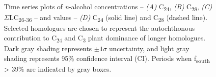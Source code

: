 \begin{figure}[p]
	\caption[\textit{n}-alcohol concentration and  time-series plots]{Time series plots of \textit{n}-alcohol concentrations -- \textit{(A)} C\textsubscript{24}, \textit{(B)} C\textsubscript{28}, \textit{(C)} $\Sigma$LC\textsubscript{26-36} -- and  values -- \textit{(D)} C\textsubscript{24} (solid line) and C\textsubscript{28} (dashed line). Selected homologues are chosen to represent the autochthonous contribution to C\textsubscript{24} and C\textsubscript{3} plant dominance of longer homologues. Dark gray shading represents $\pm 1\sigma$ uncertainty, and light gray shading represents 95\% confidence interval (CI). Periods when f\textsubscript{south} > 39\% are indicated by gray boxes.}
	\label{Ch4Fig:6} 
\end{figure}

